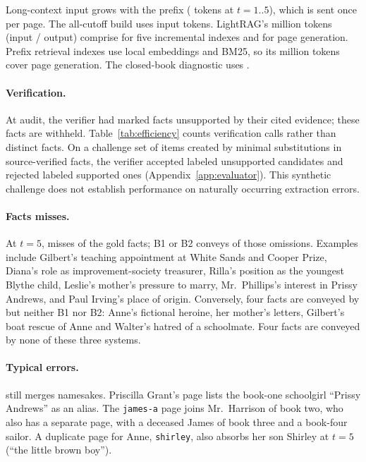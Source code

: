 Long-context input grows with the prefix ( tokens at $t=1..5$),
which is sent once per page. The all-cutoff \sys build uses
 input tokens. LightRAG's  million tokens
(input / output) comprise  for five incremental indexes
and  for page generation. Prefix retrieval indexes use local
embeddings and BM25, so its  million tokens cover page generation.
The closed-book diagnostic uses .

\paragraph{Verification.}
At audit, the verifier had marked  facts unsupported by their
cited evidence; these facts are withheld. Table~\ref{tab:efficiency} counts verification
calls rather than distinct facts. On a challenge set of  items created by
minimal substitutions in source-verified facts, the verifier accepted
 labeled unsupported candidates and rejected
 labeled supported ones (Appendix~\ref{app:evaluator}).
This synthetic challenge does not establish performance on naturally occurring
extraction errors.

\paragraph{Facts \sys misses.}
At $t=5$, \sys misses  of the  gold facts;
B1 or B2 conveys  of those omissions. Examples include
Gilbert's teaching appointment at White Sands and Cooper Prize, Diana's role as
improvement-society treasurer, Rilla's position as the youngest Blythe child,
Leslie's mother's pressure to marry, Mr.\ Phillips's interest in Prissy Andrews,
and Paul Irving's place of origin. Conversely, four facts are conveyed by \sys
but neither B1 nor B2: Anne's fictional heroine, her mother's letters, Gilbert's
boat rescue of Anne and Walter's hatred of a schoolmate. Four facts are conveyed
by none of these three systems.

\paragraph{Typical errors.}
\sys still merges namesakes. Priscilla Grant's page lists the book-one schoolgirl
``Prissy Andrews'' as an alias. The \texttt{james-a} page joins Mr.\ Harrison of
book two, who also has a separate page, with a deceased James of book three and
a book-four sailor. A duplicate page for Anne, \texttt{shirley}, also absorbs her
son Shirley at $t=5$ (``the little brown boy'').

